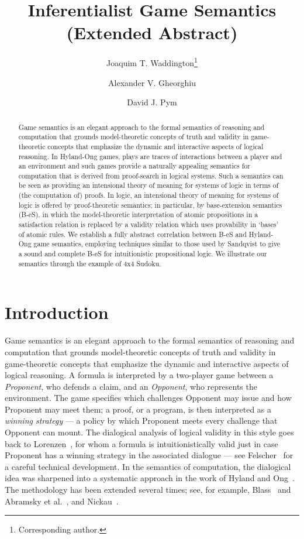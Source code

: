 \documentclass{lipics-v2021}
\title{Inferentialist Game Semantics \\ (Extended Abstract)}
\author{Joaquim T. Waddington\footnote{Corresponding author.}}{University College London}
{joaquim.waddington.24@ucl.ac.uk}{}{}
\author{Alexander V. Gheorghiu}{University College London}
{alexander.v.gheorghiu@gmail.com}{}{}
\author{David J. Pym}{UCL \& Institute of Philosophy, University of London}
{david.pym@sas.ac.uk}{}{}
\begin{document}
\maketitle

\begin{abstract}
Game semantics is an elegant approach to the formal semantics of reasoning and computation that grounds model-theoretic concepts of truth and validity in game-theoretic concepts that emphasize the dynamic and interactive aspects of logical reasoning. In Hyland-Ong games, plays are traces of interactions between a player and an environment and such games provide a naturally appealing semantics for computation that is derived from proof-search in logical systems. Such a semantics can be seen as providing an intensional theory of meaning for systems of logic in terms of (the computation of) proofs. In logic, an intensional theory of meaning for systems of logic is offered by proof-theoretic semantics; in particular, by base-extension semantics (B-eS), in which the model-theoretic interpretation of atomic propositions in a satisfaction relation is replaced by a validity relation which uses provability in `bases' of atomic rules. We establish a fully abstract correlation between B-eS and Hyland-Ong game semantics, employing techniques similar to those used by Sandqvist to give a sound and complete B-eS for intuitionistic propositional logic. 
We illustrate our semantics through the example of 
4x4 Sudoku. 
\end{abstract}

\section{Introduction}
\label{sec:introduction}
 
 Game semantics is an elegant approach to the formal semantics of reasoning and computation that grounds model-theoretic concepts of truth and validity in game-theoretic concepts that emphasize the dynamic and interactive aspects of logical reasoning. A formula is interpreted by a two-player game between a \emph{Proponent}, who defends a claim, and an \emph{Opponent}, who represents the environment. The game specifies which challenges Opponent may issue and how Proponent may meet them; a proof, or a program, is then interpreted as a \emph{winning strategy} --- a policy by which Proponent meets every challenge that Opponent can mount. The dialogical analysis of logical validity in this style goes back to Lorenzen~\cite{Lorenzen1960,LorenzenLorenz1978}, for whom a formula is intuitionistically valid just in case Proponent has a winning strategy in the associated dialogue --- see Felscher~\cite{Felscher1985} for a careful technical development. In the semantics of computation, the dialogical idea was sharpened into a systematic approach in the work of Hyland and Ong~\cite{HYLAND2000285}. The methodology has been extended several times; see, for example, Blass~\cite{Blass1992} and Abramsky et al.~\cite{AbramskyJagadeesan1994, AJM2000}, and Nickau~\cite{Nickau1994}.
 
\end{document}

